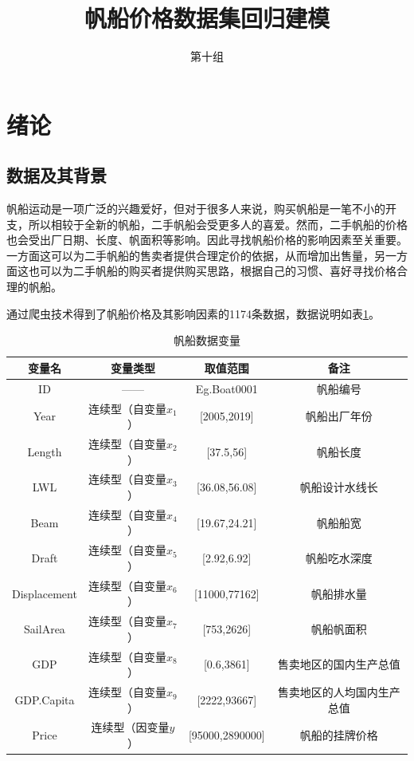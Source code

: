 \documentclass[a4paper,12pt,onecolumn,oneside]{article}
\title{帆船价格数据集回归建模}
\author{第十组}
\date{}
\begin{document}
\section{绪论}
\subsection{数据及其背景}
帆船运动是一项广泛的兴趣爱好，但对于很多人来说，购买帆船是一笔不小的开支，所以相较于全新的帆船，二手帆船会受更多人的喜爱。然而，二手帆船的价格也会受出厂日期、长度、帆面积等影响。因此寻找帆船价格的影响因素至关重要。一方面这可以为二手帆船的售卖者提供合理定价的依据，从而增加出售量，另一方面这也可以为二手帆船的购买者提供购买思路，根据自己的习惯、喜好寻找价格合理的帆船。\par 
通过爬虫技术得到了帆船价格及其影响因素的1174条数据，数据说明如表\ref{tab:boat-variables}。\par 

\begin{table}[h]
	\centering
	\caption{帆船数据变量}
	\vspace{0.5\baselineskip}
	\label{tab:boat-variables}
	\begin{tabular}{|c|c|c|c|}
		\hline
		变量名 & 变量类型 & 取值范围 & 备注 \\ \hline
		ID & —— & Eg.Boat0001 & 帆船编号 \\ \hline
		Year & 连续型（自变量$x_1$） & [2005,2019] & 帆船出厂年份 \\ \hline
		Length & 连续型（自变量$x_2$） & [37.5,56] & 帆船长度 \\ \hline
		LWL & 连续型（自变量$x_3$） & [36.08,56.08] & 帆船设计水线长 \\ \hline
		Beam & 连续型（自变量$x_4$） & [19.67,24.21] & 帆船船宽 \\ \hline
		Draft & 连续型（自变量$x_5$） & [2.92,6.92] & 帆船吃水深度 \\ \hline
		Displacement & 连续型（自变量$x_6$） & [11000,77162] & 帆船排水量 \\ \hline
		SailArea & 连续型（自变量$x_7$） & [753,2626] & 帆船帆面积 \\ \hline
		GDP & 连续型（自变量$x_8$） & [0.6,3861] & 售卖地区的国内生产总值 \\ \hline
		GDP.Capita & 连续型（自变量$x_9$） & [2222,93667] & 售卖地区的人均国内生产总值 \\ \hline
		Price & 连续型（因变量$y$） & [95000,2890000] & 帆船的挂牌价格 \\ \hline
	\end{tabular}
\end{table}
\end{document}
